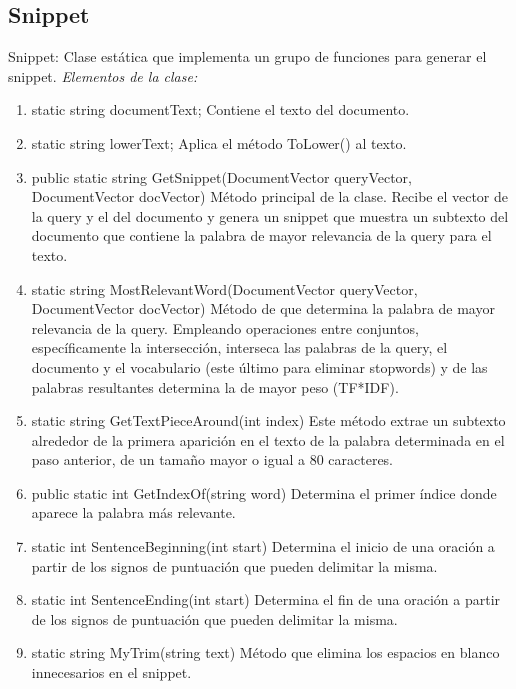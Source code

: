 \documentclass[a4paper,12pt,twocolumn]{article}
\begin{document}
\subsection{Snippet}
Snippet: Clase estática que implementa un grupo de funciones para generar el
snippet.
\emph{Elementos de la clase:}
\begin{enumerate}
    \item static string documentText;
    Contiene el texto del documento.
    \item static string lowerText;
    Aplica el método ToLower() al texto.
    \item public static string GetSnippet(DocumentVector queryVector,
    DocumentVector docVector){}
    Método principal de la clase. Recibe el vector de la query y el del documento y
    genera un snippet que muestra un subtexto del documento que contiene la palabra
    de mayor relevancia de la query para el texto.
    \item static string MostRelevantWord(DocumentVector queryVector,
    DocumentVector docVector)
    Método de que determina la palabra de mayor relevancia de la query. Empleando
    operaciones entre conjuntos, específicamente la intersección, interseca las palabras de la query, 
    el documento y el vocabulario (este último para eliminar
    stopwords) y de las palabras resultantes determina la de mayor peso (TF*IDF).
    \item static string GetTextPieceAround(int index)
    Este método extrae un subtexto alrededor de la primera aparición en el texto de la
    palabra determinada en el paso anterior, de un tamaño mayor o igual a 80
    caracteres.
    \item public static int GetIndexOf(string word)
    Determina el primer índice donde aparece la palabra más relevante.
    \item static int SentenceBeginning(int start)
    Determina el inicio de una oración a partir de los signos de puntuación que pueden
    delimitar la misma.
    \item static int SentenceEnding(int start)
    Determina el fin de una oración a partir de los signos de puntuación que pueden
    delimitar la misma.
    \item static string MyTrim(string text)
    Método que elimina los espacios en blanco innecesarios en el snippet.
\end{enumerate}
\end{document}
